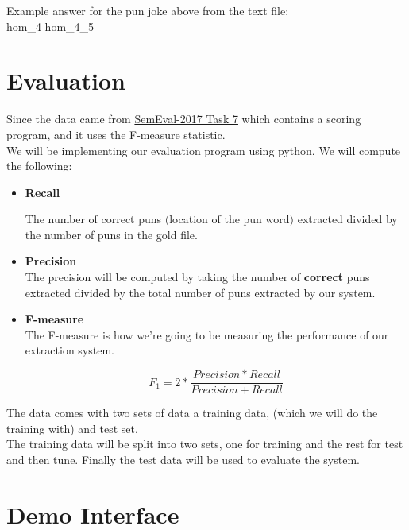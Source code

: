 \documentclass[11pt]{article}
\begin{document}
Example answer for the pun joke above from the text file:\\

hom\_4   hom\_4\_5


\section{Evaluation}\label{sec:evaluation}

Since the data came from \href{http://alt.qcri.org/semeval2017/task7/}{SemEval-2017 Task 7}
which contains a scoring program, and it uses the F-measure statistic.\\

\noindent We will be implementing our evaluation program using python.
We will compute the following:\\


\begin{itemize}

\item [] {\textbf{Recall} }


The number of correct puns $($location of the pun word$)$ extracted divided by the number
of puns in the gold file. \\

\item [] {\textbf{Precision} }\\

The precision will be computed by taking the number of {\textbf{correct} } puns extracted divided
by the total number of puns extracted by our system.

\item [] {\textbf{F-measure} }\\

The F-measure is how we're going to be measuring the performance of our extraction system.

\[F_1 = 2 * \frac{Precision * Recall} {Precision + Recall} \]

\end{itemize}

\noindent The data comes with two sets of data a training data, (which we will do the training with)
and test set. \\

\noindent The training data will be split into two sets, one for training and the rest for test and then tune.
Finally the test data will be used to evaluate the system.



\section{Demo Interface}\label{sec:demoInterface}
\end{document}
